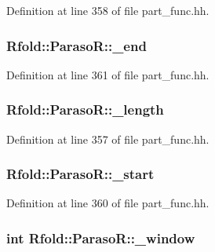 Definition at line 358 of file part\+\_\+func.\+hh.

\hypertarget{class_rfold_1_1_paraso_r_aa0a39f36fc4917382d6e95174150791f}{
\subsubsection[{\+\_\+end}]{ Rfold\+::\+Paraso\+R\+::\+\_\+end}}\label{class_rfold_1_1_paraso_r_aa0a39f36fc4917382d6e95174150791f}


Definition at line 361 of file part\+\_\+func.\+hh.

\hypertarget{class_rfold_1_1_paraso_r_afcca775aebec2ac5d0f659ddb4f625c3}{
\subsubsection[{\+\_\+length}]{ Rfold\+::\+Paraso\+R\+::\+\_\+length}}\label{class_rfold_1_1_paraso_r_afcca775aebec2ac5d0f659ddb4f625c3}


Definition at line 357 of file part\+\_\+func.\+hh.

\hypertarget{class_rfold_1_1_paraso_r_a213a200c99cd89cf6a41715b9d1b4b05}{
\subsubsection[{\+\_\+start}]{ Rfold\+::\+Paraso\+R\+::\+\_\+start}}\label{class_rfold_1_1_paraso_r_a213a200c99cd89cf6a41715b9d1b4b05}


Definition at line 360 of file part\+\_\+func.\+hh.

\hypertarget{class_rfold_1_1_paraso_r_a6b2fc60e2c500a03bf48d442cb11002c}{
\subsubsection[{\+\_\+window}]{\setlength{\rightskip}{0pt plus 5cm}int Rfold\+::\+Paraso\+R\+::\+\_\+window}}\label{class_rfold_1_1_paraso_r_a6b2fc60e2c500a03bf48d442cb11002c}


